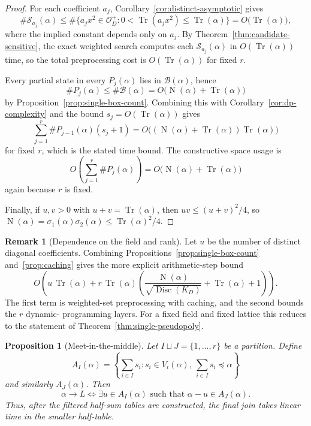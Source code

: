 \documentclass[manuscript]{acmart}
\theoremstyle{plain}
\newtheorem{proposition}[theorem]{Proposition}
\theoremstyle{definition}
\theoremstyle{nonitalicremark}
\newtheorem{remark}[theorem]{Remark}
\newcommand{\OO}{\mathcal{O}}
\newcommand{\OD}{\OO_D}
\newcommand{\Tr}{\operatorname{Tr}}
\newcommand{\N}{\operatorname{N}}
\newcommand{\Disc}{\operatorname{Disc}}
\newcommand{\cB}{\mathcal{B}}
\newcommand{\cS}{\mathcal{S}}
\begin{document}
\begin{proof}
For each coefficient $a_j$, Corollary~\ref{cor:distinct-asymptotic} gives
\[
\#\cS_{a_j}(\alpha)
\le
\#\{a_jx^2\in\OD^+ : 0<\Tr(a_jx^2)\le \Tr(\alpha)\}
=
O\bigl(\Tr(\alpha)\bigr),
\]
where the implied constant depends only on $a_j$. By Theorem~\ref{thm:candidate-sensitive}, the
exact weighted search computes each $\cS_{a_j}(\alpha)$ in $O(\Tr(\alpha))$ time, so the total
preprocessing cost is $O(\Tr(\alpha))$ for fixed $r$.

Every partial state in every $P_j(\alpha)$ lies in $\cB(\alpha)$, hence
\[
\#P_j(\alpha)\le \#\cB(\alpha)=O\bigl(\N(\alpha)+\Tr(\alpha)\bigr)
\]
by Proposition~\ref{prop:single-box-count}. Combining this with
Corollary~\ref{cor:dp-complexity} and the bound $s_j=O(\Tr(\alpha))$ gives
\[
\sum_{j=1}^r \#P_{j-1}(\alpha)(s_j+1)
=
O\bigl((\N(\alpha)+\Tr(\alpha))\Tr(\alpha)\bigr)
\]
for fixed $r$, which is the stated time bound. The constructive space usage is
\[
O\!\left(\sum_{j=1}^r \#P_j(\alpha)\right)
=
O\bigl(\N(\alpha)+\Tr(\alpha)\bigr)
\]
again because $r$ is fixed.

Finally, if $u,v>0$ with $u+v=\Tr(\alpha)$, then $uv\le (u+v)^2/4$, so
$\N(\alpha)=\sigma_1(\alpha)\sigma_2(\alpha)\le \Tr(\alpha)^2/4$.
\end{proof}

\begin{remark}[Dependence on the field and rank]
Let $u$ be the number of distinct diagonal coefficients. Combining
Propositions~\ref{prop:single-box-count} and~\ref{prop:caching} gives the more explicit
arithmetic-step bound
\[
O\!\left(
 u\,\Tr(\alpha)
 + r\,\Tr(\alpha)
 \left(\frac{\N(\alpha)}{\sqrt{\Disc(K_D)}}+\Tr(\alpha)+1\right)
\right).
\]
The first term is weighted-set preprocessing with caching, and the second bounds the $r$ dynamic-
programming layers. For a fixed field and fixed lattice this reduces to the statement of
Theorem~\ref{thm:single-pseudopoly}.
\end{remark}

\begin{proposition}[Meet-in-the-middle]\label{prop:mitm}
Let $I\sqcup J=\{1,\dots,r\}$ be a partition. Define
\[
A_I(\alpha)=\left\{\sum_{i\in I}s_i : s_i\in V_i(\alpha),\ \sum_{i\in I}s_i\preccurlyeq \alpha\right\}
\]
and similarly $A_J(\alpha)$. Then
\[
\alpha\to L
\iff
\exists u\in A_I(\alpha)\text{ such that }\alpha-u\in A_J(\alpha).
\]
Thus, after the filtered half-sum tables are constructed, the final join takes linear time in the
smaller half-table.
\end{proposition}
\end{document}
